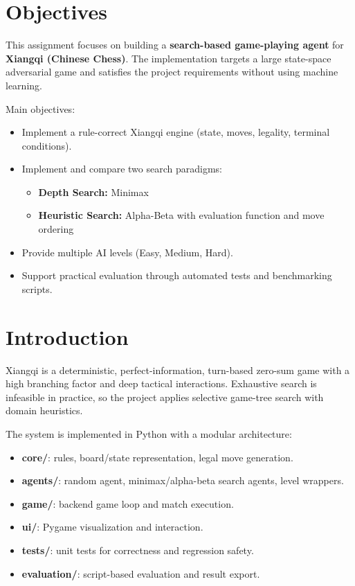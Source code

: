 \documentclass[a4paper,12pt]{article}
\begin{document}
\tableofcontents
\newpage


\section{Objectives}

This assignment focuses on building a \textbf{search-based game-playing agent} for \textbf{Xiangqi (Chinese Chess)}.
The implementation targets a large state-space adversarial game and satisfies the project requirements without using machine learning.

Main objectives:
\begin{itemize}
    \item Implement a rule-correct Xiangqi engine (state, moves, legality, terminal conditions).
    \item Implement and compare two search paradigms:
    \begin{itemize}
        \item \textbf{Depth Search:} Minimax
        \item \textbf{Heuristic Search:} Alpha-Beta with evaluation function and move ordering
    \end{itemize}
    \item Provide multiple AI levels (Easy, Medium, Hard).
    \item Support practical evaluation through automated tests and benchmarking scripts.
\end{itemize}

\section{Introduction}

Xiangqi is a deterministic, perfect-information, turn-based zero-sum game with a high branching factor and deep tactical interactions. Exhaustive search is infeasible in practice, so the project applies selective game-tree search with domain heuristics.

The system is implemented in Python with a modular architecture:
\begin{itemize}
    \item \textbf{core/}: rules, board/state representation, legal move generation.
    \item \textbf{agents/}: random agent, minimax/alpha-beta search agents, level wrappers.
    \item \textbf{game/}: backend game loop and match execution.
    \item \textbf{ui/}: Pygame visualization and interaction.
    \item \textbf{tests/}: unit tests for correctness and regression safety.
    \item \textbf{evaluation/}: script-based evaluation and result export.
\end{itemize}
\end{document}
